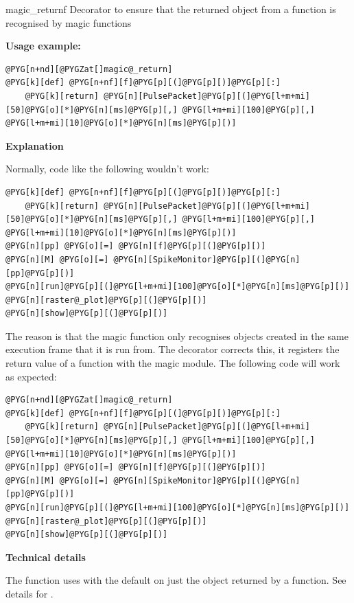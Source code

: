 \documentclass[letterpaper,10pt,english]{manual}
\begin{document}
\hypertarget{brian.magic_return}{}\begin{funcdesc}{magic\_return}{f}
Decorator to ensure that the returned object from a function is recognised by magic functions

\textbf{Usage example:}

\begin{Verbatim}[commandchars=@\[\]]
@PYG[n+nd][@PYGZat[]magic@_return]
@PYG[k][def] @PYG[n+nf][f]@PYG[p][(]@PYG[p][)]@PYG[p][:]
    @PYG[k][return] @PYG[n][PulsePacket]@PYG[p][(]@PYG[l+m+mi][50]@PYG[o][*]@PYG[n][ms]@PYG[p][,] @PYG[l+m+mi][100]@PYG[p][,] @PYG[l+m+mi][10]@PYG[o][*]@PYG[n][ms]@PYG[p][)]
\end{Verbatim}

\textbf{Explanation}

Normally, code like the following wouldn't work:

\begin{Verbatim}[commandchars=@\[\]]
@PYG[k][def] @PYG[n+nf][f]@PYG[p][(]@PYG[p][)]@PYG[p][:]
    @PYG[k][return] @PYG[n][PulsePacket]@PYG[p][(]@PYG[l+m+mi][50]@PYG[o][*]@PYG[n][ms]@PYG[p][,] @PYG[l+m+mi][100]@PYG[p][,] @PYG[l+m+mi][10]@PYG[o][*]@PYG[n][ms]@PYG[p][)]
@PYG[n][pp] @PYG[o][=] @PYG[n][f]@PYG[p][(]@PYG[p][)]
@PYG[n][M] @PYG[o][=] @PYG[n][SpikeMonitor]@PYG[p][(]@PYG[n][pp]@PYG[p][)]
@PYG[n][run]@PYG[p][(]@PYG[l+m+mi][100]@PYG[o][*]@PYG[n][ms]@PYG[p][)]
@PYG[n][raster@_plot]@PYG[p][(]@PYG[p][)]
@PYG[n][show]@PYG[p][(]@PYG[p][)]
\end{Verbatim}

The reason is that the magic function \hyperlink{brian.run}{} only recognises objects created
in the same execution frame that it is run from. The \hyperlink{brian.magic_return}{} decorator
corrects this, it registers the return value of a function with the magic
module. The following code will work as expected:

\begin{Verbatim}[commandchars=@\[\]]
@PYG[n+nd][@PYGZat[]magic@_return]
@PYG[k][def] @PYG[n+nf][f]@PYG[p][(]@PYG[p][)]@PYG[p][:]
    @PYG[k][return] @PYG[n][PulsePacket]@PYG[p][(]@PYG[l+m+mi][50]@PYG[o][*]@PYG[n][ms]@PYG[p][,] @PYG[l+m+mi][100]@PYG[p][,] @PYG[l+m+mi][10]@PYG[o][*]@PYG[n][ms]@PYG[p][)]
@PYG[n][pp] @PYG[o][=] @PYG[n][f]@PYG[p][(]@PYG[p][)]
@PYG[n][M] @PYG[o][=] @PYG[n][SpikeMonitor]@PYG[p][(]@PYG[n][pp]@PYG[p][)]
@PYG[n][run]@PYG[p][(]@PYG[l+m+mi][100]@PYG[o][*]@PYG[n][ms]@PYG[p][)]
@PYG[n][raster@_plot]@PYG[p][(]@PYG[p][)]
@PYG[n][show]@PYG[p][(]@PYG[p][)]
\end{Verbatim}

\textbf{Technical details}

The \hyperlink{brian.magic_return}{} function uses \hyperlink{brian.magic_register}{} with the default 
on just the object returned by a function. See details for \hyperlink{brian.magic_register}{}.
\end{funcdesc}
\end{document}
